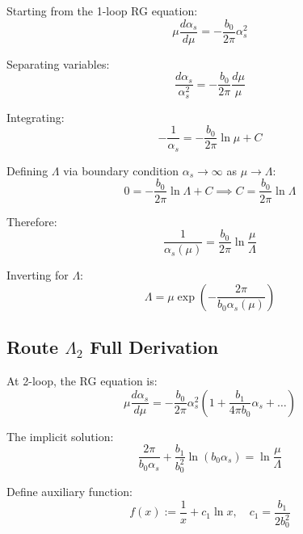 \documentclass[11pt,a4paper]{article}
\theoremstyle{definition}
\begin{document}
Starting from the 1-loop RG equation:
\begin{equation}
\label{eq:rge-1loop-app}
\mu\frac{d\alpha_s}{d\mu} = -\frac{b_0}{2\pi}\alpha_s^2
\end{equation}

Separating variables:
\begin{equation}
\label{eq:rge-separate}
\frac{d\alpha_s}{\alpha_s^2} = -\frac{b_0}{2\pi}\frac{d\mu}{\mu}
\end{equation}

Integrating:
\begin{equation}
\label{eq:rge-integrate}
-\frac{1}{\alpha_s} = -\frac{b_0}{2\pi}\ln\mu + C
\end{equation}

Defining $\Lambda$ via boundary condition $\alpha_s \to \infty$ as $\mu \to \Lambda$:
\begin{equation}
\label{eq:lambda-bc}
0 = -\frac{b_0}{2\pi}\ln\Lambda + C \implies C = \frac{b_0}{2\pi}\ln\Lambda
\end{equation}

Therefore:
\begin{equation}
\label{eq:alpha-lambda-rel}
\frac{1}{\alpha_s(\mu)} = \frac{b_0}{2\pi}\ln\frac{\mu}{\Lambda}
\end{equation}

Inverting for $\Lambda$:
\begin{equation}
\label{eq:lambda1-derivation}
\boxed{\Lambda = \mu \exp\left(-\frac{2\pi}{b_0\alpha_s(\mu)}\right)}
\end{equation}

\subsection{Route $\Lambda_2$ Full Derivation}
\label{subsec:lambda2-full}

At 2-loop, the RG equation is:
\begin{equation}
\label{eq:rge-2loop-app}
\mu\frac{d\alpha_s}{d\mu} = -\frac{b_0}{2\pi}\alpha_s^2\left(1 + \frac{b_1}{4\pi b_0}\alpha_s + \ldots\right)
\end{equation}

The implicit solution:
\begin{equation}
\label{eq:2loop-implicit}
\frac{2\pi}{b_0\alpha_s} + \frac{b_1}{b_0^2}\ln(b_0\alpha_s) = \ln\frac{\mu}{\Lambda}
\end{equation}

Define auxiliary function:
\begin{equation}
\label{eq:auxiliary-f}
f(x) := \frac{1}{x} + c_1\ln x, \quad c_1 = \frac{b_1}{2b_0^2}
\end{equation}
\end{document}
